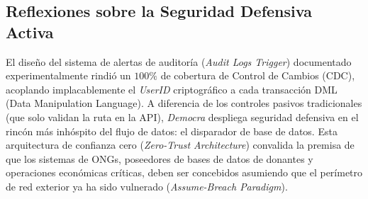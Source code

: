 \subsection{Reflexiones sobre la Seguridad Defensiva Activa}

El dise\~no del sistema de alertas de auditor\'ia (\textit{Audit Logs Trigger}) documentado experimentalmente rindi\'o un $100\%$ de cobertura de Control de Cambios (CDC), acoplando implacablemente el \textit{UserID} criptogr\'afico a cada transacci\'on DML (Data Manipulation Language). A diferencia de los controles pasivos tradicionales (que solo validan la ruta en la API), \textit{Democra} despliega seguridad defensiva en el rinc\'on m\'as inh\'ospito del flujo de datos: el disparador de base de datos. Esta arquitectura de confianza cero (\textit{Zero-Trust Architecture}) convalida la premisa de que los sistemas de ONGs, poseedores de bases de datos de donantes y operaciones econ\'omicas cr\'iticas, deben ser concebidos asumiendo que el per\'imetro de red exterior ya ha sido vulnerado (\textit{Assume-Breach Paradigm}).
